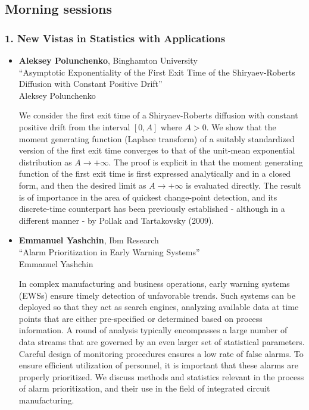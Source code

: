 
\subsection*{Morning sessions}

\subsubsection*{1. New Vistas in Statistics with Applications}

\begin{itemize}
\item \textbf{Aleksey Polunchenko}, Binghamton University \\
``Asymptotic Exponentiality of the First Exit Time of the Shiryaev-Roberts Diffusion with Constant Positive Drift'' \\
Aleksey Polunchenko


We consider the first exit time of a Shiryaev-Roberts diffusion with constant positive drift from the interval $[0,A]$ where $A>0$. We show that the moment generating function (Laplace transform) of a suitably standardized version of the first exit time converges to that of the unit-mean exponential distribution as $A\to+\infty$. The proof is explicit in that the moment generating function of the first exit time is first expressed analytically and in a closed form, and then the desired limit as $A\to+\infty$ is evaluated directly. The result is of importance in the area of quickest change-point detection, and its discrete-time counterpart has been previously established - although in a different manner - by Pollak and Tartakovsky (2009).

\item \textbf{Emmanuel Yashchin}, Ibm Research \\
``Alarm Prioritization in Early Warning Systems'' \\
Emmanuel Yashchin


In complex manufacturing and business operations, early warning systems (EWSs) ensure timely detection of unfavorable trends. Such systems can be deployed so that they act as search engines, analyzing available data at time points that are either pre-specified or determined based on process information. A round of analysis typically encompasses a large number of data streams that are governed by an even larger set of statistical parameters. Careful design of monitoring procedures ensures a low rate of false alarms. To ensure efficient utilization of personnel, it is important that these alarms are properly prioritized. We discuss methods and statistics relevant in the process of alarm prioritization, and their use in the field of integrated circuit manufacturing. 


\end{itemize}

